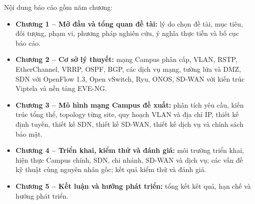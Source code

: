 Nội dung báo cáo gồm năm chương:
\begin{itemize}
    \item \textbf{Chương 1 -- Mở đầu và tổng quan đề tài:} lý do chọn đề tài, mục tiêu, đối tượng, phạm vi, phương pháp nghiên cứu, ý nghĩa thực tiễn và bố cục báo cáo.
    \item \textbf{Chương 2 -- Cơ sở lý thuyết:} mạng Campus phân cấp, VLAN, RSTP, EtherChannel, VRRP, OSPF, BGP, các dịch vụ mạng, tường lửa và DMZ, SDN với OpenFlow 1.3, Open vSwitch, Ryu, ONOS, SD-WAN với kiến trúc Viptela và nền tảng EVE-NG.
    \item \textbf{Chương 3 -- Mô hình mạng Campus đề xuất:} phân tích yêu cầu, kiến trúc tổng thể, topology từng site, quy hoạch VLAN và địa chỉ IP, thiết kế định tuyến, thiết kế SDN, thiết kế SD-WAN, thiết kế dịch vụ và chính sách bảo mật.
    \item \textbf{Chương 4 -- Triển khai, kiểm thử và đánh giá:} môi trường triển khai, hiện thực Campus chính, SDN, chi nhánh, SD-WAN và dịch vụ; các vấn đề kỹ thuật cùng nguyên nhân gốc; kết quả kiểm thử và đánh giá.
    \item \textbf{Chương 5 -- Kết luận và hướng phát triển:} tổng kết kết quả, hạn chế và hướng phát triển.
\end{itemize}
